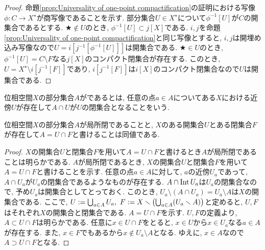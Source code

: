 \documentclass[uplatex, dvipdfmx, a4paper, 12pt, class=jsbook, crop=false]{standalone}
\begin{document}
\begin{proof}
	命題\ref{prop:Universality of one-point compactification}の証明における写像$ \phi \colon C \to X^{\star} $が商写像であることを示す. 部分集合$ U \in X^\star $について$ \phi^{-1}[U] $が$ C $の開集合であるとする. $ \bigstar \notin U $のとき, $ \phi^{-1}[U] \subset j[X] $である. $ i, j $を命題\ref{prop:Universality of one-point compactification}と同じ写像とすると, $ i, j $は開埋め込み写像なので$ U = i[j^{-1}[\phi^{-1}[U]]] $は開集合である. $ \bigstar \in U $のとき, $ \phi^{-1}[U] = C \setminus F $なる$ j[X] $のコンパクト閉集合が存在する. このとき, $ U = X^\star \setminus i[j^{-1}[F]] $であり, $ i[j^{-1}[F]] $は$ i[X] $のコンパクト閉集合なので$ U $は開集合である.
\end{proof}


\begin{definition}
	位相空間$ X $の部分集合$ A $がであるとは, 任意の点$ a \in A $についてある$ X $における近傍$ U $が存在して$ A \cap U $が$ U $の閉集合となることをいう.
\end{definition}

\begin{proposition}
	\label{lemma:Characterization of locally-closedness}
	位相空間$ X $の部分集合$ A $が局所閉であることと, $ X $のある開集合$ U $とある閉集合$ F $が存在して$ A = U \cap F $と書けることは同値である.
\end{proposition}

\begin{proof}
	$ X $の開集合$ U $と閉集合$ F $を用いて$ A = U \cap F $と書けるとき$ A $が局所閉であることは明らかである. $ A $が局所閉であるとき, $ X $の開集合$ U $と閉集合$ F $を用いて$ A = U \cap F $と書けることを示す. 任意の点$ a \in A $に対して, $ a $の近傍$ U_a $であって, $ A \cap U_a $が$ U_a $の閉集合であるようなものが存在する. $ A \cap \mathop{\mathrm{Int}}\nolimits U_a $は$ U_a $の閉集合なので, 予め$ U_a $は開集合としてとっておく. このとき, $ U_a \setminus (A \cap U_a) = U_a \setminus A $は$ X $の開集合である. ここで, $ U \mathrel{:=} \bigcup_{a \in A} U_a, \ F \mathrel{:=} X \smallsetminus \left(\bigcup_{a \in A} (U_a \smallsetminus A) \right) $と定めると, $ U, F $はそれぞれ$ X $の開集合と閉集合である. $ A = U \cap F $を示す. $ U, F $の定義より, $ A \subset U \cap F $は明らかである. 任意に$ x \in U \cap F $をとると, $ x \in U $から$ x \in U_a $なる$ a \in A $が存在する. また, $ x \in F $でもあるから$ x \notin U_a \setminus  A $となる. ゆえに, $ x \in A $なので$ A \supset U \cap F $となる.
\end{proof}
\end{document}
